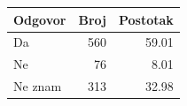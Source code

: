 \begin{tabular}{lrr}
\toprule
Odgovor & Broj & Postotak \\
\midrule
Da & 560 & 59.01 \\
Ne & 76 & 8.01 \\
Ne znam & 313 & 32.98 \\
\bottomrule
\end{tabular}
